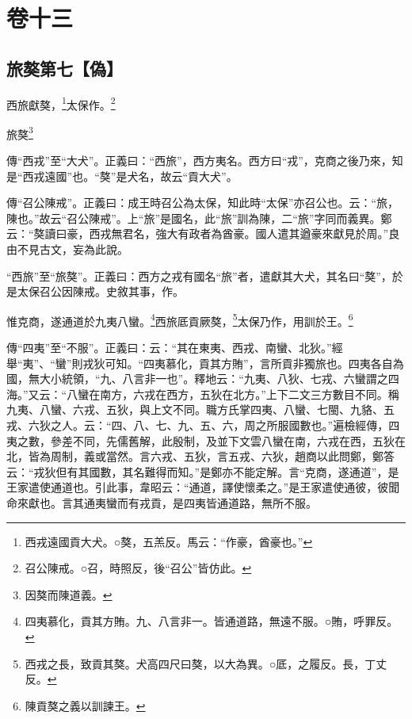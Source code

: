 

\chapter{卷十三}


\section{旅獒第七【偽】}


西旅獻獒，\footnote{西戎遠國貢大犬。○獒，五羔反。馬云：“作豪，酋豪也。”}太保作。\footnote{召公陳戒。○召，時照反，後“召公”皆仿此。}

旅獒\footnote{因獒而陳道義。}


{\noindent\zhuan{}\fzbyks 傳“西戎”至“大犬”。正義曰：“西旅”，西方夷名。西方曰“戎”，克商之後乃來，知是“西戎遠國”也。“獒”是犬名，故云“貢大犬”。 \par}

{\noindent\zhuan{}\fzbyks 傳“召公陳戒”。正義曰：成王時召公為太保，知此時“太保”亦召公也。云：“旅，陳也。”故云“召公陳戒”。上“旅”是國名，此“旅”訓為陳，二“旅”字同而義異。鄭云：“獒讀曰豪，西戎無君名，強大有政者為酋豪。國人遣其遒豪來獻見於周。”良由不見古文，妄為此說。 \par}

{\noindent\shu{}\fzkt “西旅”至“旅獒”。正義曰：西方之戎有國名“旅”者，遣獻其大犬，其名曰“獒”，於是太保召公因陳戒。史敘其事，作。 \par}

惟克商，遂通道於九夷八蠻。\footnote{四夷慕化，貢其方賄。九、八言非一。皆通道路，無遠不服。○賄，呼罪反。}西旅厎貢厥獒，\footnote{西戎之長，致貢其獒。犬高四尺曰獒，以大為異。○厎，之履反。長，丁丈反。}太保乃作，用訓於王。\footnote{陳貢獒之義以訓諫王。}


{\noindent\zhuan{}\fzbyks 傳“四夷”至“不服”。正義曰：云：“其在東夷、西戎、南蠻、北狄。”經舉“夷”、“蠻”則戎狄可知。“四夷慕化，貢其方賄”，言所貢非獨旅也。四夷各自為國，無大小統領，“九、八言非一也”。釋地云：“九夷、八狄、七戎、六蠻謂之四海。”又云：“八蠻在南方，六戎在西方，五狄在北方。”上下二文三方數目不同。稱九夷、八蠻、六戎、五狄，與上文不同。職方氏掌四夷、八蠻、七閩、九貉、五戎、六狄之人。云：“四、八、七、九、五、六，周之所服國數也。”遍檢經傳，四夷之數，參差不同，先儒舊解，此殷制，及並下文雲八蠻在南，六戎在西，五狄在北，皆為周制，義或當然。言六戎、五狄，言五戎、六狄，趙商以此問鄭，鄭答云：“戎狄但有其國數，其名難得而知。”是鄭亦不能定解。言“克商，遂通道”，是王家遣使通道也。引此事，韋昭云：“通道，譯使懷柔之。”是王家遣使通彼，彼聞命來獻也。言其通夷蠻而有戎貢，是四夷皆通道路，無所不服。 \par}

